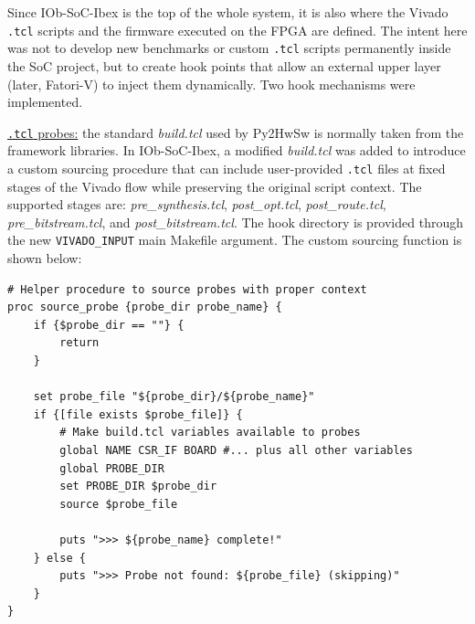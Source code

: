  Since IOb-SoC-Ibex is the top of the whole system, it is also where the Vivado \texttt{.tcl} scripts and the firmware executed on the \ac{FPGA} are defined. The intent here was not to develop new benchmarks or custom \texttt{.tcl} scripts permanently inside the \ac{SoC} project, but to create hook points that allow an external upper layer (later, \ac{Fatori-V}) to inject them dynamically. Two hook mechanisms were implemented.

 \underline{\texttt{.tcl} probes:} the standard \textit{build.tcl} used by Py2HwSw is normally taken from the framework libraries. In IOb-SoC-Ibex, a modified \textit{build.tcl} was added to introduce a custom sourcing procedure that can include user-provided \texttt{.tcl} files at fixed stages of the Vivado flow while preserving the original script context. The supported stages are: \textit{pre\_synthesis.tcl}, \textit{post\_opt.tcl}, \textit{post\_route.tcl}, \textit{pre\_bitstream.tcl}, and \textit{post\_bitstream.tcl}. The hook directory is provided through the new \texttt{VIVADO\_INPUT} main Makefile argument. The custom sourcing function is shown below:
\begin{lstlisting}[language=matlabfloz,caption={Custom TCL function to source hook probes}]
# Helper procedure to source probes with proper context
proc source_probe {probe_dir probe_name} {
    if {$probe_dir == ""} {
        return
    }

    set probe_file "${probe_dir}/${probe_name}"
    if {[file exists $probe_file]} {
        # Make build.tcl variables available to probes
        global NAME CSR_IF BOARD #... plus all other variables
        global PROBE_DIR
        set PROBE_DIR $probe_dir
        source $probe_file

        puts ">>> ${probe_name} complete!"
    } else {
        puts ">>> Probe not found: ${probe_file} (skipping)"
    }
}
\end{lstlisting}

